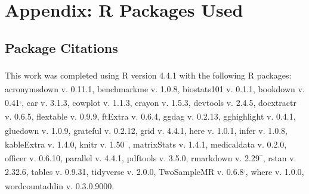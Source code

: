 \documentclass[
]{article}
\begin{document}
\newpage

\section{Appendix: R Packages Used}\label{appendix-pkg}

\subsection{Package Citations}\label{package-citations}

This work was completed using R version 4.4.1\textsuperscript{} with the following R packages: acronymsdown v. 0.11.1\textsuperscript{}, benchmarkme v. 1.0.8\textsuperscript{}, biostats101 v. 0.1.1\textsuperscript{}, bookdown v. 0.41\textsuperscript{,}, car v. 3.1.3\textsuperscript{}, cowplot v. 1.1.3\textsuperscript{}, crayon v. 1.5.3\textsuperscript{}, devtools v. 2.4.5\textsuperscript{}, docxtractr v. 0.6.5\textsuperscript{}, flextable v. 0.9.9\textsuperscript{}, ftExtra v. 0.6.4\textsuperscript{}, ggdag v. 0.2.13\textsuperscript{}, gghighlight v. 0.4.1\textsuperscript{}, gluedown v. 1.0.9\textsuperscript{}, grateful v. 0.2.12\textsuperscript{}, grid v. 4.4.1\textsuperscript{}, here v. 1.0.1\textsuperscript{}, infer v. 1.0.8\textsuperscript{}, kableExtra v. 1.4.0\textsuperscript{}, knitr v. 1.50\textsuperscript{--}, matrixStats v. 1.4.1\textsuperscript{}, medicaldata v. 0.2.0\textsuperscript{}, officer v. 0.6.10\textsuperscript{}, parallel v. 4.4.1\textsuperscript{}, pdftools v. 3.5.0\textsuperscript{}, rmarkdown v. 2.29\textsuperscript{--}, rstan v. 2.32.6\textsuperscript{}, tables v. 0.9.31\textsuperscript{}, tidyverse v. 2.0.0\textsuperscript{}, TwoSampleMR v. 0.6.8\textsuperscript{,}, where v. 1.0.0\textsuperscript{}, wordcountaddin v. 0.3.0.9000\textsuperscript{}.
\end{document}
